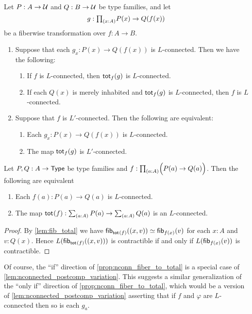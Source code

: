 \begin{cor}\label{lem:nconnected_postcomp_variation}
Let $P:A\to\UU$ and $Q:B\to\UU$ be type families, and let
\begin{equation*}
g:\prd{x:A}P(x)\to Q(f(x))
\end{equation*}
be a fiberwise transformation over $f:A\to B$.
\begin{enumerate}
\item Suppose that each $g_x:P(x)\to Q(f(x))$ is $L$-connected. Then we have the following:
\begin{enumerate}
\item If $f$ is $L$-connected, then $\total[f]{g}$ is $L$-connected.
\item If each $Q(x)$ is merely inhabited and $\total[f]{g}$ is $L$-connected, then $f$ is $L$-connected.
\end{enumerate}
\item Suppose that $f$ is $L'$-connected. Then the following are equivalent:
\begin{enumerate}
\item Each $g_x:P(x)\to Q(f(x))$ is $L$-connected.
\item The map $\total[f]{g}$ is $L'$-connected.
\end{enumerate}  
\end{enumerate}
\end{cor}

\begin{prp}\label{prop:nconn_fiber_to_total}
Let $P,Q:A\to\type$ be type families and $f:\prd{a:A} \Parens{P(a)\to Q(a)}$. Then the following are equivalent
\begin{enumerate}
\item Each $f(a):P(a)\to Q(a)$ is $L$-connected.
\item The map $\total{f}: \sm{a:A}P(a) \to \sm{a:A} Q(a)$ is an $L$-connected.
\end{enumerate}
\end{prp}

\begin{proof}
By \cref{lem:fib_total} we have $\fib{\total f}{\pairr{x,v}}\eqvsym\fib{f(x)}v$
for each $x:A$ and $v:Q(x)$. Hence $L(\fib{\total f}{\pairr{x,v}})$ is contractible if and only if
$L(\fib{f(x)}v)$ is contractible.
\end{proof}

Of course, the ``if'' direction of \cref{prop:nconn_fiber_to_total} is a special case of \cref{lem:nconnected_postcomp_variation}.
This suggests a similar generalization of the ``only if'' direction of \cref{prop:nconn_fiber_to_total}, which would be a version of \cref{lem:nconnected_postcomp_variation} asserting that if $f$ and $\varphi$ are $L$-connected then so is each $g_a$.

